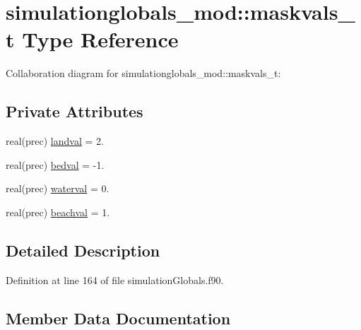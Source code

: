 \hypertarget{structsimulationglobals__mod_1_1maskvals__t}{}\section{simulationglobals\+\_\+mod\+:\+:maskvals\+\_\+t Type Reference}
\label{structsimulationglobals__mod_1_1maskvals__t}


Collaboration diagram for simulationglobals\+\_\+mod\+:\+:maskvals\+\_\+t\+:
\subsection*{Private Attributes}
\begin{DoxyCompactItemize}
\item 
real(prec) \mbox{\hyperlink{structsimulationglobals__mod_1_1maskvals__t_a6b8266db0422df028f6a2abe90382fcf}{landval}} = 2.
\item 
real(prec) \mbox{\hyperlink{structsimulationglobals__mod_1_1maskvals__t_a300c996800a60fde8b960454efa5250b}{bedval}} = -\/1.
\item 
real(prec) \mbox{\hyperlink{structsimulationglobals__mod_1_1maskvals__t_ad37aae6fd7454ee653511020ad79f539}{waterval}} = 0.
\item 
real(prec) \mbox{\hyperlink{structsimulationglobals__mod_1_1maskvals__t_a68a1cb8107af729c423523b42da036e0}{beachval}} = 1.
\end{DoxyCompactItemize}


\subsection{Detailed Description}


Definition at line 164 of file simulation\+Globals.\+f90.



\subsection{Member Data Documentation}
\mbox{\label{structsimulationglobals__mod_1_1maskvals__t_a68a1cb8107af729c423523b42da036e0}} 
